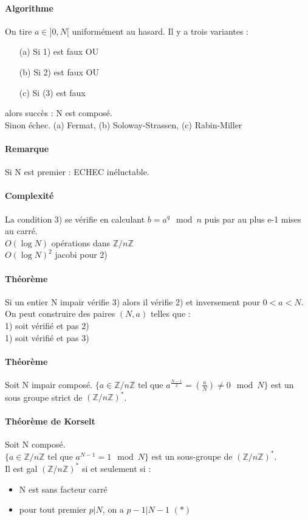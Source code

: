 \documentclass[12pt,a4paper]{report}
\begin{document}
\paragraph{Algorithme\\}
On tire $a \in ]0,N[$ uniformément au hasard. Il y a trois variantes :
\begin{itemize}
\item[(a)] Si 1) est faux OU 
\item[(b)] Si 2) est faux OU
\item[(c)] Si (3) est faux
\end{itemize}
alors succès : N est composé.\\
Sinon échec.
(a) Fermat, (b) Soloway-Strassen, (c) Rabin-Miller\\
\paragraph{Remarque\\}
Si N est premier : ECHEC inéluctable.
\paragraph{Complexité\\}
La condition 3) se vérifie en calculant $b=a^q \mod n$ puis par au plus e-1 mises au carré. \\
$O(\log N)$ opérations dans $\mathbb{Z}/n\mathbb{Z}$\\
$O(\log N)^2$ jacobi pour 2)
\paragraph{Théorème\\}
Si un entier N impair vérifie 3) alors il vérifie 2) et inversement pour $0 < a < N$.
On peut construire des paires $(N,a)$ telles que :\\
1) soit vérifié et pas 2)\\
1) soit vérifié et pas 3)\\
\paragraph{Théorème\\}
Soit N impair composé. $ \{a \in \mathbb{Z}/n\mathbb{Z} \mbox{ tel que } a^{\frac{N-1}{2}} =  \displaystyle \left(\frac{a}{N}\right) \neq 0 \mod N \}$ est un sous groupe strict de $(\mathbb{Z}/n\mathbb{Z})^*$.
\paragraph{Théorème de Korselt\\}
Soit N composé. \\
$\{ a \in \mathbb{Z}/n\mathbb{Z} \mbox{ tel que } a^{N-1} = 1 \mod N\}$ est un sous-groupe de $(\mathbb{Z}/n\mathbb{Z})^*$.\\
Il est gal  $(\mathbb{Z}/n\mathbb{Z})^*$ si et seulement si :
\begin{itemize}
\item N est sans facteur carré 
\item pour tout premier $p|N$, on a $p-1|N-1$ $(*)$
\end{itemize}
\end{document}
